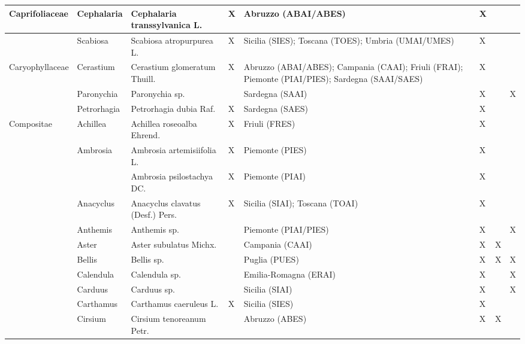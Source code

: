 \documentclass[main.tex]{subfiles}
\begin{document}
    \clearpage
        
        \begin{table}[!ht]
        \centering
    \begin{tabular}[\footnotesize]{|p{2.2cm}|p{2.2cm}|p{2.2cm}|p{1.1cm}|p{1.6cm}|p{0.8cm}|p{1cm}|p{0.8cm}|}
    \hline
        Caprifoliaceae & Cephalaria & Cephalaria transsylvanica L. & X & Abruzzo (ABAI/ABES) & X & ~ & ~ \\ \hline
        ~ & Scabiosa & Scabiosa atropurpurea L. & X & Sicilia (SIES); Toscana (TOES); Umbria (UMAI/UMES) & X & ~ & ~ \\ \hline
        Caryophyllaceae & Cerastium & Cerastium glomeratum Thuill. & X & Abruzzo (ABAI/ABES); Campania (CAAI); Friuli (FRAI); Piemonte (PIAI/PIES); Sardegna (SAAI/SAES) & X & ~ & ~ \\ \hline
        ~ & Paronychia & Paronychia sp. & ~ & Sardegna (SAAI) & X & ~ & X \\ \hline
        ~ & Petrorhagia & Petrorhagia dubia Raf. & X & Sardegna (SAES) & X & ~ & ~ \\ \hline
        Compositae & Achillea & Achillea roseoalba Ehrend. & X & Friuli (FRES) & X & ~ & ~ \\ \hline
        ~ & Ambrosia & Ambrosia artemisiifolia L. & X & Piemonte (PIES) & X & ~ & ~ \\ \hline
        ~ & ~ & Ambrosia psilostachya DC. & X & Piemonte (PIAI) & X & ~ & ~ \\ \hline
        ~ & Anacyclus & Anacyclus clavatus (Desf.) Pers. & X & Sicilia (SIAI); Toscana (TOAI) & X & ~ & ~ \\ \hline
        ~ & Anthemis & Anthemis sp. & ~ & Piemonte (PIAI/PIES) & X & ~ & X \\ \hline
        ~ & Aster & Aster subulatus Michx. & ~ & Campania (CAAI) & X & X & ~ \\ \hline
        ~ & Bellis  & Bellis sp. & ~ & Puglia (PUES) & X & X & X \\ \hline
        ~ & Calendula & Calendula sp. & ~ & Emilia-Romagna (ERAI) & X & ~ & X \\ \hline
        ~ & Carduus & Carduus sp. & ~ & Sicilia (SIAI) & X & ~ & X \\ \hline
        ~ & Carthamus & Carthamus caeruleus L. & X & Sicilia (SIES) & X & ~ & ~ \\ \hline
        ~ & Cirsium & Cirsium tenoreanum Petr. & ~ & Abruzzo (ABES) & X & X & ~ \\ \hline
    \end{tabular}
    \end{table}
    
\end{document}

